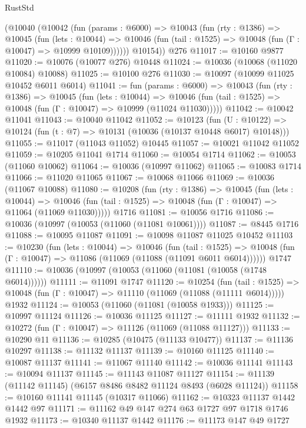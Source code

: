 \begin{lexlean}{RustStd}
\begin{coremodule}
{{      (@10040
        (@10042
          (fun (params : @6000) =>
          @10043
            (fun (rty : @1386) =>
            @10045
              (fun (lets : @10044) =>
              @10046 (fun (tail : @1525) => @10048 (fun (Γ : @10047) => @10999 @10109))))))
        @10154))
    @276
@11017 := @10160 @9877
@11020 := @10076 (@10077 @276) @10448
@11024 := @10036 (@10068 (@11020 @10084) @10088)
@11025 := @10100 @276
@11030 := @10097 (@10099 @11025 @10452 @6011 @6014)
@11041 := fun (params : @6000) =>
  @10043
    (fun (rty : @1386) =>
    @10045
      (fun (lets : @10044) =>
      @10046 (fun (tail : @1525) => @10048 (fun (Γ : @10047) => @10999 (@11024 @11030)))))
@11042 := @10042 @11041
@11043 := @10040 @11042
@11052 := @10123
    (fun (U : @10122) => @10124 (fun (t : @7) => @10131 (@10036 (@10137 @10448 @6017) @10148)))
@11055 := @11017 (@11043 @11052) @10445
@11057 := @10021 @11042 @11052
@11059 := @10205 @11041 @1714
@11060 := @10054 @1714
@11062 := @10053 (@11060 @10062)
@11064 := @10036 (@10997 @11062)
@11065 := @10083 @1714
@11066 := @11020 @11065
@11067 := @10068 @11066
@11069 := @10036 (@11067 @10088)
@11080 := @10208
    (fun (rty : @1386) =>
    @10045
      (fun (lets : @10044) =>
      @10046 (fun (tail : @1525) => @10048 (fun (Γ : @10047) => @11064 (@11069 @11030)))))
    @1716
@11081 := @10056 @1716
@11086 := @10036 (@10997 (@10053 (@11060 (@11081 @10061))))
@11087 := @8445 @1716
@11088 := @10095 @11087
@11091 := @10098 @11087 @11025 @10452
@11103 := @10230
    (fun (lets : @10044) =>
    @10046
      (fun (tail : @1525) =>
      @10048 (fun (Γ : @10047) => @11086 (@11069 (@11088 (@11091 @6011 @6014))))))
    @1747
@11110 := @10036 (@10997 (@10053 (@11060 (@11081 (@10058 (@1748 @6014))))))
@11111 := @11091 @1747
@11120 := @10254
    (fun (tail : @1525) => @10048 (fun (Γ : @10047) => @11110 (@11069 (@11088 (@11111 @6014)))))
    @1932
@11124 := @10053 (@11060 (@11081 (@10058 @1933)))
@11125 := @10997 @11124
@11126 := @10036 @11125
@11127 := @11111 @1932
@11132 := @10272 (fun (Γ : @10047) => @11126 (@11069 (@11088 @11127)))
@11133 := @10290 @11
@11136 := @10285 (@10475 (@11133 @10477))
@11137 := @11136 @10297
@11138 := @11132 @11137
@11139 := @10160 @11125
@11140 := @10087 @11137
@11141 := @11067 @11140
@11142 := @10036 @11141
@11143 := @10094 @11137
@11145 := @11143 @11087 @11127
@11154 := @11139 (@11142 @11145) (@6157 @8486 @8482 @11124 @8493 (@6028 @11124))
@11158 := @10160 @11141 @11145 (@10317 @11066)
@11162 := @10323 @11137 @1442 @1442 @97
@11171 := @11162 @49 @147 @274 @63 @1727 @97 @1718 @1746 @1932
@11173 := @10340 @11137 @1442
@11176 := @11173 @147 @49 @1727
}}
\end{coremodule}
\end{lexlean}
